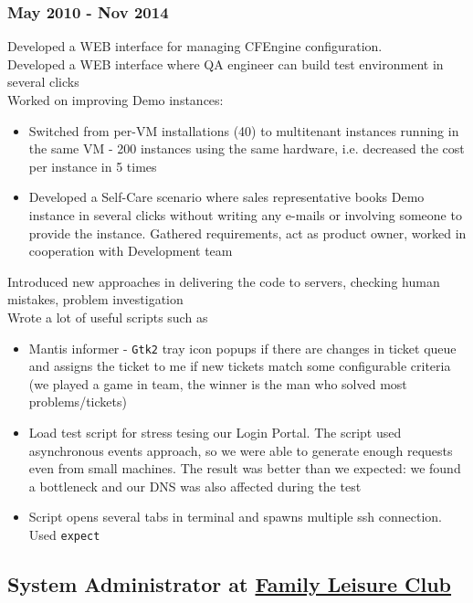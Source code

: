 \documentclass[letterpaper]{article}
\begin{document}
\subsubsection{May 2010 - Nov 2014}
\label{sec-2-3-1}
Developed a WEB interface for managing CFEngine configuration.\\
Developed a WEB interface where QA engineer can build test environment in several clicks\\
Worked on improving Demo instances:
\begin{itemize}
\item Switched from per-VM installations (40) to multitenant instances running in the same VM - 200 instances using the same hardware, i.e. decreased the cost per instance in 5 times
\item Developed a Self-Care scenario where sales representative books Demo instance in several clicks without writing any e-mails or involving someone to provide the instance. Gathered requirements, act as product owner, worked in cooperation with Development team
\end{itemize}
Introduced new approaches in delivering the code to servers, checking human mistakes, problem investigation\\
Wrote a lot of useful scripts such as
\begin{itemize}
\item Mantis informer - \verb~Gtk2~ tray icon popups if there are changes in ticket queue and assigns the ticket to me if new tickets match some configurable criteria (we played a game in team, the winner is the man who solved most problems/tickets)
\item Load test script for stress tesing our Login Portal. The script used asynchronous events approach, so we were able to generate enough requests even from small machines. The result was better than we expected: we found a bottleneck and our DNS was also affected during the test
\item Script opens several tabs in terminal and spawns multiple ssh connection. Used \verb~expect~
\end{itemize}
\subsection{System Administrator at \href{https://www.ksd.ua/en/}{Family Leisure Club}}
\label{sec-2-4}
\end{document}
